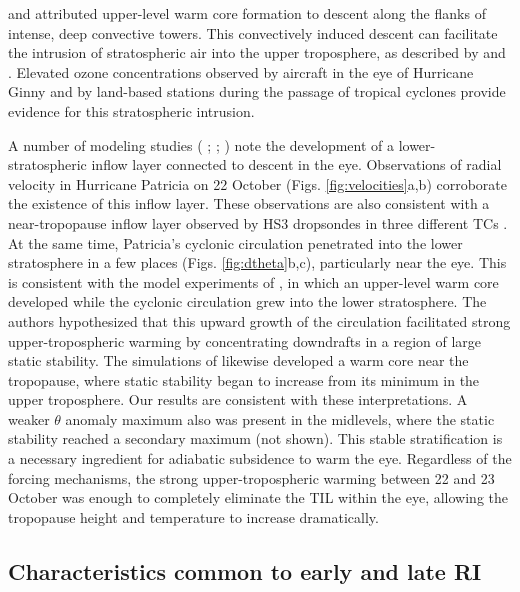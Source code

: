 \cite{Guimondetal2010} and \cite{ChenZhang2013} attributed upper-level warm core formation to descent along the flanks of intense, deep convective towers.
This convectively induced descent can facilitate the intrusion of stratospheric air into the upper troposphere, as described by \cite{ZhangChen2012} and \cite{OhnoSatoh2015}.
Elevated ozone concentrations observed by aircraft in the eye of Hurricane Ginny \citep{Penn1965} and by land-based stations during the passage of tropical cyclones \citep{Dasetal2016} provide evidence for this stratospheric intrusion.

A number of modeling studies (\citeauthor{ZhangChen2012} \citeyear{ZhangChen2012}; \citeauthor{OhnoSatoh2015} \citeyear{OhnoSatoh2015}; \citeauthor{Kieuetal2016} \citeyear{Kieuetal2016}) note the development of a lower-stratospheric inflow layer connected to descent in the eye.
Observations of radial velocity in Hurricane Patricia on 22 October (Figs. \ref{fig:velocities}a,b) corroborate the existence of this inflow layer.
These observations are also consistent with a near-tropopause inflow layer observed by HS3 dropsondes in three different TCs \citep{KomaromiDoyle2017}.
At the same time, Patricia’s cyclonic circulation penetrated into the lower stratosphere in a few places (Figs. \ref{fig:dtheta}b,c), particularly near the eye.
This is consistent with the model experiments of \cite{OhnoSatoh2015}, in which an upper-level warm core developed while the cyclonic circulation grew into the lower stratosphere.
The authors hypothesized that this upward growth of the circulation facilitated strong upper-tropospheric warming by concentrating downdrafts in a region of large static stability.
The simulations of \cite{SternZhang2013} likewise developed a warm core near the tropopause, where static stability began to increase from its minimum in the upper troposphere.
Our results are consistent with these interpretations.
A weaker $\theta$ anomaly maximum also was present in the midlevels, where the static stability reached a secondary maximum (not shown).
This stable stratification is a necessary ingredient for adiabatic subsidence to warm
the eye.
Regardless of the forcing mechanisms, the strong upper-tropospheric warming between 22 and 23 October was enough to completely eliminate the TIL within the eye, allowing the tropopause height and temperature to increase dramatically.

\subsection{Characteristics common to early and late RI}

